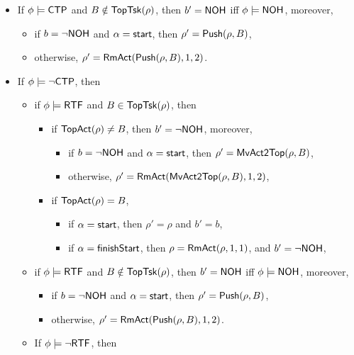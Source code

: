 \begin{itemize}
\begin{itemize}
\begin{itemize}
		\end{itemize}
		\end{itemize}
		\item If $\phi \models {\sf CTP}$ and $B \notin \mathsf{TopTsk}(\rho)$, then $b' = {\sf NOH}$ iff $\phi \models {\sf NOH}$, moreover,
		\begin{itemize}
			\item if $b = \neg {\sf NOH}$ and $\alpha = {\mathsf{start} }$, then $\rho' = \mathsf{Push}(\rho, B)$, 
			\item otherwise, $\rho' = \mathsf{RmAct}( \mathsf{Push}(\rho, B), 1, 2)$. 
		\end{itemize}
		\item If $\phi \models \neg {\sf CTP}$, then
		\begin{itemize}
			\item if $\phi \models {\sf RTF}$ and $B \in \mathsf{TopTsk}(\rho)$, then
			\begin{itemize}
				\item if $\mathsf{TopAct}(\rho) \neq B$, then $b' = \neg {\sf NOH}$, moreover, 
				\begin{itemize}
					\item if $b = \neg {\sf NOH}$ and $\alpha = {\mathsf{start} }$, then $\rho'= \mathsf{MvAct2Top}(\rho, B)$, 
					\item otherwise, $\rho' = \mathsf{RmAct}(\mathsf{MvAct2Top}(\rho, B), 1, 2)$, 
				\end{itemize}
				\item if $\mathsf{TopAct}(\rho) = B$, 
				\begin{itemize}
					\item if $\alpha = {\mathsf{start} }$, then $\rho' = \rho$ and $b' = b$,
					\item if $\alpha = {\mathsf{finishStart} }$, then $\rho = \mathsf{RmAct}(\rho, 1, 1)$, and $b' = \neg {\sf NOH}$,
				\end{itemize}
			\end{itemize}
			\item if $\phi \models {\sf RTF}$ and $B \notin \mathsf{TopTsk}(\rho)$, then $b' = {\sf NOH}$ iff $\phi \models {\sf NOH}$, moreover,
			\begin{itemize}
				\item if $b = \neg {\sf NOH}$ and $\alpha = {\mathsf{start} }$, then $\rho' = \mathsf{Push}(\rho, B)$, 
				\item otherwise, $\rho' = \mathsf{RmAct}( \mathsf{Push}(\rho, B), 1, 2)$. 
			\end{itemize}
			\item If $\phi \models \neg {\sf RTF}$, then

\end{itemize}
\end{itemize}
